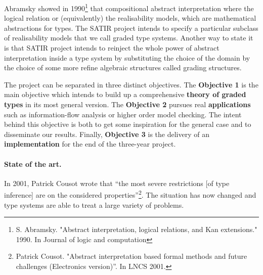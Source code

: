 \documentclass{article}[11pt]
\begin{document}
Abramsky showed in 1990\footnote{S. Abramsky. "Abstract interpretation, logical relations, and Kan extensions." 1990. In Journal of logic and computation} that compositional abstract interpretation where the logical relation or (equivalently) the realisability models, which are mathematical abstractions for types. The SATIR project intends to specify a particular subclass of realisability models that we call graded type systems. Another way to state it is that SATIR project intends to reinject the whole power of abstract interpretation inside a type system by substituting the choice of the domain by the choice of some more refine algebraic structures called grading structures.

The project can be separated in three distinct objectives. The {\bf Objective 1} is the main objective which intends to build up a comprehensive {\bf theory of graded types} in its most general version. The {\bf Objective 2} pursues real {\bf applications} such as information-flow analysis or higher order model checking. %
The intent behind this objective is both to get some inspiration for the general case and to disseminate our results. Finally, {\bf Objective 3} is the delivery of an {\bf implementation} for the end of the three-year project.


\paragraph{State of the art.}


In 2001, Patrick Cousot wrote that ``the most severe restrictions [of type inference] are on the considered properties''\footnote{Patrick Cousot. "Abstract interpretation based formal methods and future challenges (Electronics version)''. In LNCS 2001.}. The situation has now changed and type systems are able to treat a large variety of problems.
\end{document}
